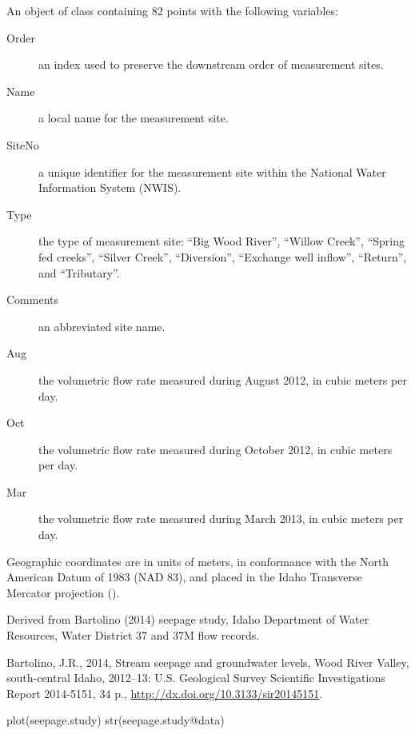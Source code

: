 \documentclass[letterpaper]{book}
\begin{document}
%
\begin{Format}
An object of  class containing 82 points with the following variables:
\begin{description}

\item[Order] an index used to preserve the downstream order of measurement sites.
\item[Name] a local name for the measurement site.
\item[SiteNo] a unique identifier for the measurement site within the National Water Information System (NWIS).
\item[Type] the type of measurement site:
``Big Wood River'', ``Willow Creek'', ``Spring fed creeks'', ``Silver Creek'', ``Diversion'', ``Exchange well inflow'', ``Return'', and ``Tributary''.
\item[Comments] an abbreviated site name.
\item[Aug] the volumetric flow rate measured during August 2012, in cubic meters per day.
\item[Oct] the volumetric flow rate measured during October 2012, in cubic meters per day.
\item[Mar] the volumetric flow rate measured during March 2013, in cubic meters per day.

\end{description}

Geographic coordinates are in units of meters, in conformance with the North American Datum of 1983 (NAD 83), and placed in the
Idaho Transverse Mercator projection ().
\end{Format}
%
\begin{Source}\relax
Derived from Bartolino (2014) seepage study, Idaho Department of Water Resources, Water District 37 and 37M flow records.
\end{Source}
%
\begin{References}\relax
Bartolino, J.R., 2014, Stream seepage and groundwater levels, Wood River Valley, south-central Idaho, 2012--13: U.S. Geological Survey Scientific Investigations Report 2014-5151, 34 p., \url{http://dx.doi.org/10.3133/sir20145151}.
\end{References}
%
\begin{Examples}
\begin{ExampleCode}
plot(seepage.study)
str(seepage.study@data)
\end{ExampleCode}
\end{Examples}
\end{document}
